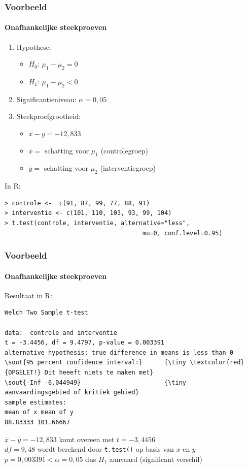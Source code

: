 \documentclass{beamer}
\begin{document}
\begin{frame}[fragile]
  \frametitle{Voorbeeld}
  \framesubtitle{Onafhankelijke steekproeven}
\begin{enumerate}
  \item Hypothese:
    \begin{itemize}
     \item $H_0$: $\mu_1 - \mu_2 = 0$
     \item $H_1$: $\mu_1 - \mu_2 < 0$
    \end{itemize}
  \item Significantieniveau: $\alpha = 0,05$
  \item Steekproefgrootheid:
    \begin{itemize}
     \item $\overline{x}-\overline{y} = -12,833$
     \item $\overline{x} =$ schatting voor $\mu_1$ (controlegroep) 
     \item $\overline{y} =$ schatting voor $\mu_2$ (interventiegroep) 
    \end{itemize}
\end{enumerate}
\vfill
In R:
{\footnotesize
\begin{Verbatim}[commandchars=\\\{\}]
> controle <-  c(91, 87, 99, 77, 88, 91)
> interventie <- c(101, 110, 103, 93, 99, 104)
> t.test(controle, interventie, alternative="less",
                                      mu=0, conf.level=0.95)
\end{Verbatim}
}
\end{frame}

\begin{frame}[fragile]
  \frametitle{Voorbeeld}
  \framesubtitle{Onafhankelijke steekproeven}
Resultaat in R:
{\footnotesize
\begin{Verbatim}[commandchars=\\\{\}]
Welch Two Sample t-test

data:  controle and interventie
t = -3.4456, df = 9.4797, p-value = 0.003391
alternative hypothesis: true difference in means is less than 0
\sout{95 percent confidence interval:}      {\tiny \textcolor{red}{OPGELET!} Dit heeeft niets te maken met}
\sout{-Inf -6.044949}                       {\tiny   aanvaardingsgebied of kritiek gebied}
sample estimates:
mean of x mean of y 
88.83333 101.66667
\end{Verbatim}
}
\vfill
$\overline{x}-\overline{y}=-12,833$ komt overeen met $t=-3,4456$\\
$df=9,48$ wordt berekend door \texttt{t.test()} op basis van $x$ en $y$\\
$p = 0,003391 < \alpha = 0,05$ dus $H_1$ aanvaard (significant verschil)
\end{frame}
\end{document}
